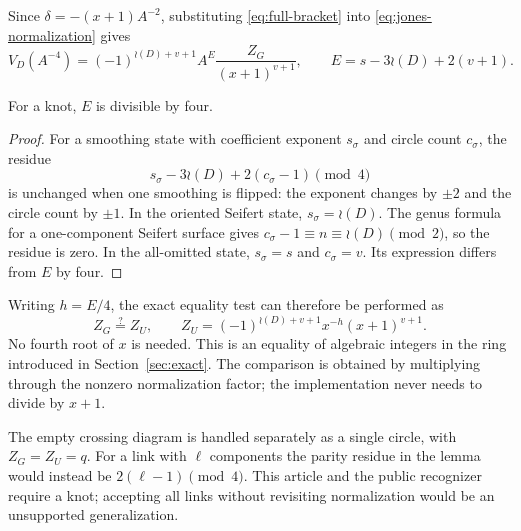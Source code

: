 Since $\delta=-(x+1)A^{-2}$, substituting
\eqref{eq:full-bracket} into \eqref{eq:jones-normalization} gives
\begin{equation}
 V_D(A^{-4})
 =(-1)^{\wr(D)+v+1}A^E
   \frac{Z_G}{(x+1)^{v+1}},
 \qquad E=s-3\wr(D)+2(v+1).
 \label{eq:normalize-E}
\end{equation}

\begin{lemma}\label{lem:parity}
For a knot, $E$ is divisible by four.
\end{lemma}
\begin{proof}
For a smoothing state with coefficient exponent $s_\sigma$ and circle
count $c_\sigma$, the residue
\[
 s_\sigma-3\wr(D)+2(c_\sigma-1)\pmod4
\]
is unchanged when one smoothing is flipped: the exponent changes by
$\pm2$ and the circle count by $\pm1$. In the oriented Seifert state,
$s_\sigma=\wr(D)$. The genus formula for a one-component Seifert surface
gives $c_\sigma-1\equiv n\equiv\wr(D)\pmod2$, so the residue is zero.
In the all-omitted state, $s_\sigma=s$ and $c_\sigma=v$.
Its expression differs from $E$ by four.
\end{proof}

Writing $h=E/4$, the exact equality test can therefore be performed as
\begin{equation}
 Z_G\stackrel{?}{=}Z_U,\qquad
 Z_U=(-1)^{\wr(D)+v+1}x^{-h}(x+1)^{v+1}.
 \label{eq:unknot-partition}
\end{equation}
No fourth root of $x$ is needed. This is an equality of algebraic integers in
the ring introduced in Section~\ref{sec:exact}. The comparison is obtained by
multiplying through the nonzero normalization factor; the implementation
never needs to divide by $x+1$.

The empty crossing diagram is handled separately as a single circle, with
$Z_G=Z_U=q$. For a link with $\ell$ components the parity residue in the lemma
would instead be $2(\ell-1)\pmod4$. This article and the public recognizer
require a knot; accepting all links without revisiting normalization would
be an unsupported generalization.
